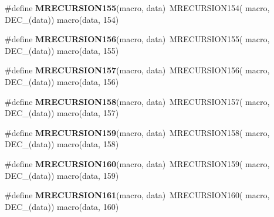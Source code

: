 \begin{DoxyCompactItemize}
\item 
\hypertarget{group__group__sam0__utils__mrecursion_gae7fdd694998d7f45d73f51305b8d8f1f}{}\#define {\bfseries M\+R\+E\+C\+U\+R\+S\+I\+O\+N155}(macro,  data)~M\+R\+E\+C\+U\+R\+S\+I\+O\+N154(  macro, D\+E\+C\+\_\+(data))   macro(data, 154)\label{group__group__sam0__utils__mrecursion_gae7fdd694998d7f45d73f51305b8d8f1f}

\item 
\hypertarget{group__group__sam0__utils__mrecursion_ga87de4a3978fb584862694e65f870c5d2}{}\#define {\bfseries M\+R\+E\+C\+U\+R\+S\+I\+O\+N156}(macro,  data)~M\+R\+E\+C\+U\+R\+S\+I\+O\+N155(  macro, D\+E\+C\+\_\+(data))   macro(data, 155)\label{group__group__sam0__utils__mrecursion_ga87de4a3978fb584862694e65f870c5d2}

\item 
\hypertarget{group__group__sam0__utils__mrecursion_ga481d40dbd33826b73a0e2920a726c0f8}{}\#define {\bfseries M\+R\+E\+C\+U\+R\+S\+I\+O\+N157}(macro,  data)~M\+R\+E\+C\+U\+R\+S\+I\+O\+N156(  macro, D\+E\+C\+\_\+(data))   macro(data, 156)\label{group__group__sam0__utils__mrecursion_ga481d40dbd33826b73a0e2920a726c0f8}

\item 
\hypertarget{group__group__sam0__utils__mrecursion_ga90de60faf1fb23d6aa01aaccbe3b4e79}{}\#define {\bfseries M\+R\+E\+C\+U\+R\+S\+I\+O\+N158}(macro,  data)~M\+R\+E\+C\+U\+R\+S\+I\+O\+N157(  macro, D\+E\+C\+\_\+(data))   macro(data, 157)\label{group__group__sam0__utils__mrecursion_ga90de60faf1fb23d6aa01aaccbe3b4e79}

\item 
\hypertarget{group__group__sam0__utils__mrecursion_gaaef0c4232ced8fccec8764fc981ef985}{}\#define {\bfseries M\+R\+E\+C\+U\+R\+S\+I\+O\+N159}(macro,  data)~M\+R\+E\+C\+U\+R\+S\+I\+O\+N158(  macro, D\+E\+C\+\_\+(data))   macro(data, 158)\label{group__group__sam0__utils__mrecursion_gaaef0c4232ced8fccec8764fc981ef985}

\item 
\hypertarget{group__group__sam0__utils__mrecursion_ga89acda6db52162017b6af2601a8ec0d4}{}\#define {\bfseries M\+R\+E\+C\+U\+R\+S\+I\+O\+N160}(macro,  data)~M\+R\+E\+C\+U\+R\+S\+I\+O\+N159(  macro, D\+E\+C\+\_\+(data))   macro(data, 159)\label{group__group__sam0__utils__mrecursion_ga89acda6db52162017b6af2601a8ec0d4}

\item 
\hypertarget{group__group__sam0__utils__mrecursion_ga00b14059593a449a083e403139ea228b}{}\#define {\bfseries M\+R\+E\+C\+U\+R\+S\+I\+O\+N161}(macro,  data)~M\+R\+E\+C\+U\+R\+S\+I\+O\+N160(  macro, D\+E\+C\+\_\+(data))   macro(data, 160)\label{group__group__sam0__utils__mrecursion_ga00b14059593a449a083e403139ea228b}


\end{DoxyCompactItemize}
